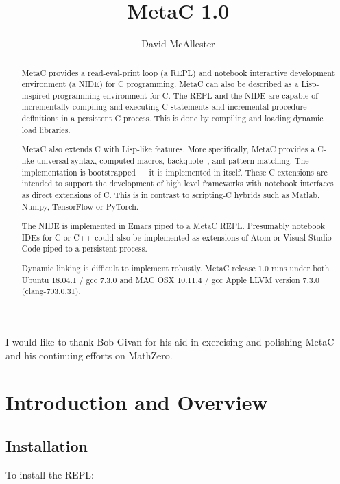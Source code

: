 \documentclass{article}
\title{MetaC 1.0}
\author{David McAllester}
\begin{document}
\maketitle

\begin{abstract}
  MetaC provides a read-eval-print loop (a REPL) and notebook interactive development environment (a NIDE) for C programming.
  MetaC can also be described as a Lisp-inspired programming environment for C.
  The REPL and the NIDE  are capable of incrementally compiling and executing
  C statements and incremental procedure definitions in a persistent C process.  This is done by compiling and loading dynamic load libraries.

  MetaC also extends C with Lisp-like features. More specifically, MetaC provides a C-like universal syntax,
  computed macros, backquote~\cite{backquote}, and pattern-matching.
  The implementation is bootstrapped --- it is implemented in itself.  These C extensions are intended to support the development of high level
  frameworks with notebook interfaces as direct extensions of C.  This is in contrast to scripting-C hybrids such as Matlab, Numpy, TensorFlow or PyTorch.

  The NIDE is implemented in Emacs piped to a MetaC REPL.  Presumably notebook IDEs for C or C++ could also be implemented as extensions
  of Atom or Visual Studio Code piped to a persistent process.

  Dynamic linking is difficult to implement robustly.
  MetaC release 1.0 runs under both Ubuntu 18.04.1 / gcc 7.3.0 and MAC OSX 10.11.4 / gcc Apple LLVM version 7.3.0 (clang-703.0.31).
\end{abstract}

\vfill
{}  I would like to thank Bob Givan for his aid in exercising and polishing MetaC and his continuing efforts on MathZero.
\newpage

\tableofcontents

\newpage

\section{Introduction and Overview}

\subsection{Installation}

\noindent To install the REPL:
\end{document}
